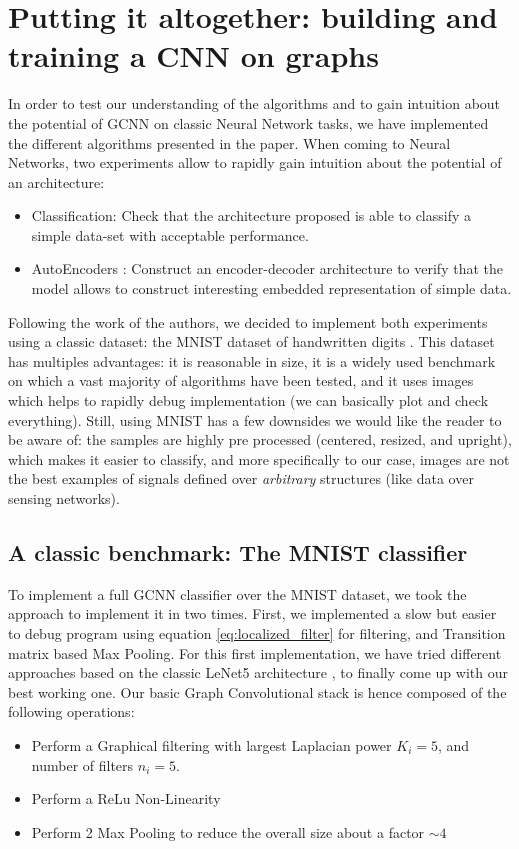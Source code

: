 \section{Putting it altogether: building and training a CNN on graphs}

In order to test our understanding of the algorithms and to gain intuition about the potential of GCNN on classic Neural Network tasks, we have implemented the different algorithms presented in the paper. When coming to Neural Networks, two experiments allow to rapidly gain intuition about the potential of an architecture:
\begin{itemize}
    \item Classification: Check that the architecture proposed is able to classify a simple data-set with acceptable performance.
    \item AutoEncoders : Construct an encoder-decoder architecture to verify that the model allows to construct interesting embedded representation of simple data. 
\end{itemize}

Following the work of the authors, we decided to implement both experiments using a classic dataset: the MNIST dataset of handwritten digits \cite{lecun1998mnist}. This dataset has multiples advantages: it is reasonable in size, it is a widely used benchmark on which a vast majority of algorithms have been tested, and it uses images which helps to rapidly debug implementation (we can basically plot and check everything). Still, using MNIST has a few downsides we would like the reader to be aware of: the samples are highly pre processed (centered, resized, and upright), which makes it easier to classify, and more specifically to our case, images are not the best examples of signals defined over \emph{arbitrary} structures (like data over sensing networks). 

\subsection{A classic benchmark: The MNIST classifier}
To implement a full GCNN classifier over the MNIST dataset, we took the approach to implement it in two times. First, we implemented a slow but easier to debug program using equation \ref{eq:localized_filter} for filtering, and Transition matrix based Max Pooling. For this first implementation, we have tried different approaches based on the classic LeNet5 architecture \cite{LeCun1998-Lenet5}, to finally come up with our best working one. Our basic Graph Convolutional stack is hence composed of the following operations:
\begin{itemize}
    \item Perform a Graphical filtering with largest Laplacian power $K_i=5$, and number of filters $n_i=5$.
    \item Perform a ReLu Non-Linearity
    \item Perform 2 Max Pooling to reduce the overall size about a factor $\sim 4$
\end{itemize}

